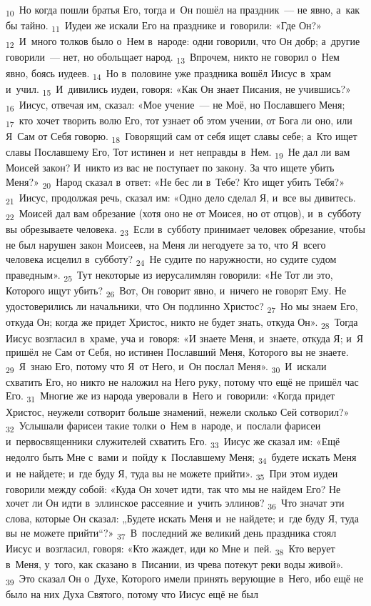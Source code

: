 \documentclass[a4paper,12pt]{article}
\begin{document}
 \textsubscript{10}~Но когда пошли братья Его, тогда и~Он пошёл на праздник~--- не явно, а~как бы тайно. \textsubscript{11}~Иудеи же искали Его на празднике и~говорили: «Где Он?» \textsubscript{12}~И~много толков было о~Нем в~народе: одни говорили, что Он добр; а~другие говорили~--- нет, но обольщает народ. \textsubscript{13}~Впрочем, никто не говорил о~Нем явно, боясь иудеев. \textsubscript{14}~Но в~половине уже праздника вошёл Иисус в~храм и~учил. \textsubscript{15}~И~дивились иудеи, говоря: «Как Он знает Писания, не учившись?» \textsubscript{16}~Иисус, отвечая им, сказал: «Мое учение~--- не Моё, но Пославшего Меня; \textsubscript{17}~кто хочет творить волю Его, тот узнает об этом учении, от Бога ли оно, или Я~Сам от Себя говорю. \textsubscript{18}~Говорящий сам от себя ищет славы себе; а~Кто ищет славы Пославшему Его, Тот истинен и~нет неправды в~Нем. \textsubscript{19}~Не дал ли вам Моисей закон? И~никто из вас не поступает по закону. За что ищете убить Меня?» \textsubscript{20}~Народ сказал в~ответ: «Не бес ли в~Тебе? Кто ищет убить Тебя?» \textsubscript{21}~Иисус, продолжая речь, сказал им: «Одно дело сделал Я, и~все вы дивитесь. \textsubscript{22}~Моисей дал вам обрезание (хотя оно не от Моисея, но от отцов), и~в~субботу вы обрезываете человека. \textsubscript{23}~Если в~субботу принимает человек обрезание, чтобы не был нарушен закон Моисеев, на Меня ли негодуете за то, что Я~всего человека исцелил в~субботу? \textsubscript{24}~Не судите по наружности, но судите судом праведным». \textsubscript{25}~Тут некоторые из иерусалимлян говорили: «Не Тот ли это, Которого ищут убить? \textsubscript{26}~Вот, Он говорит явно, и~ничего не говорят Ему. Не удостоверились ли начальники, что Он подлинно Христос? \textsubscript{27}~Но мы знаем Его, откуда Он; когда же придет Христос, никто не будет знать, откуда Он». \textsubscript{28}~Тогда Иисус возгласил в~храме, уча и~говоря: «И знаете Меня, и~знаете, откуда Я; и~Я пришёл не Сам от Себя, но истинен Пославший Меня, Которого вы не знаете. \textsubscript{29}~Я~знаю Его, потому что Я~от Него, и~Он послал Меня». \textsubscript{30}~И~искали схватить Его, но никто не наложил на Него руку, потому что ещё не пришёл час Его. \textsubscript{31}~Многие же из народа уверовали в~Него и~говорили: «Когда придет Христос, неужели сотворит больше знамений, нежели сколько Сей сотворил?» \textsubscript{32}~Услышали фарисеи такие толки о~Нем в~народе, и~послали фарисеи и~первосвященники служителей схватить Его. \textsubscript{33}~Иисус же сказал им: «Ещё недолго быть Мне с~вами и~пойду к~Пославшему Меня; \textsubscript{34}~будете искать Меня и~не найдете; и~где буду Я, туда вы не можете прийти». \textsubscript{35}~При этом иудеи говорили между собой: «Куда Он хочет идти, так что мы не найдем Его? Не хочет ли Он идти в~эллинское рассеяние и~учить эллинов? \textsubscript{36}~Что значат эти слова, которые Он сказал: „Будете искать Меня и~не найдете; и~где буду Я, туда вы не можете прийти“?» \textsubscript{37}~В~последний же великий день праздника стоял Иисус и~возгласил, говоря: «Кто жаждет, иди ко Мне и~пей. \textsubscript{38}~Кто верует в~Меня, у~того, как сказано в~Писании, из чрева потекут реки воды живой». \textsubscript{39}~Это сказал Он о~Духе, Которого имели принять верующие в~Него, ибо ещё не было на них Духа Святого, потому что Иисус ещё не был 
\end{document}
